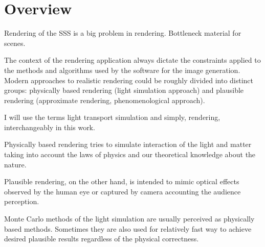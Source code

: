 \section{Overview}
\label{section:overview}
Rendering of the SSS is a big problem in rendering. Bottleneck material for
scenes.

The context of the rendering application always dictate the constraints
applied to the methods and algorithms used by the software for the image generation.
Modern approaches to realistic rendering could be roughly divided into distinct
groups:
physically based rendering (light simulation approach) and plausible rendering
(approximate rendering, phenomenological approach).

I will use the terms light transport simulation and simply, rendering,
interchangeably in this work.

Physically based rendering tries to simulate interaction of the light and matter
taking into account the laws of physics and our theoretical knowledge about the
nature.

Plausible rendering, on the other hand, is intended to mimic optical effects
observed by the human eye or captured by camera accounting the audience
perception.

Monte Carlo methods of the light simulation are usually perceived as
physically based methods. Sometimes they are also used for relatively fast way
to achieve desired plausible results regardless of the physical correctness.